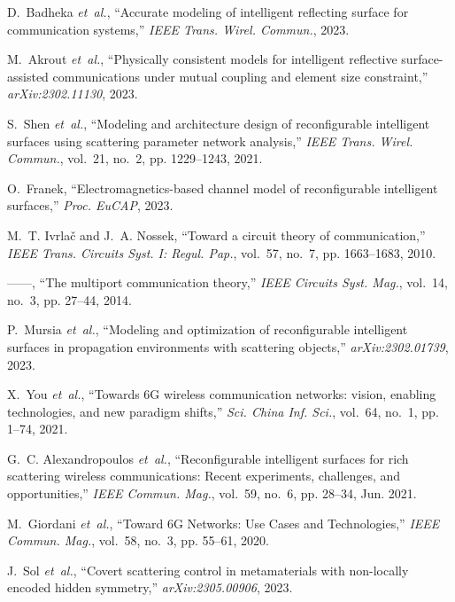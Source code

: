 \documentclass[journal,12pt,onecolumn,draftclsnofoot]{IEEEtran}
\begin{document}
\begin{thebibliography}{10}
D.~Badheka \emph{et~al.}, ``Accurate modeling of intelligent reflecting surface
  for communication systems,'' \emph{IEEE Trans. Wirel. Commun.}, 2023.

M.~Akrout \emph{et~al.}, ``Physically consistent models for intelligent
  reflective surface-assisted communications under mutual coupling and element
  size constraint,'' \emph{arXiv:2302.11130}, 2023.

S.~Shen \emph{et~al.}, ``Modeling and architecture design of reconfigurable
  intelligent surfaces using scattering parameter network analysis,''
  \emph{IEEE Trans. Wirel. Commun.}, vol.~21, no.~2, pp. 1229--1243, 2021.

O.~Franek, ``Electromagnetics-based channel model of reconfigurable intelligent
  surfaces,'' \emph{Proc. EuCAP}, 2023.

M.~T. Ivrla{\v{c}} and J.~A. Nossek, ``Toward a circuit theory of
  communication,'' \emph{IEEE Trans. Circuits Syst. I: Regul. Pap.}, vol.~57,
  no.~7, pp. 1663--1683, 2010.

------, ``The multiport communication theory,'' \emph{IEEE Circuits Syst.
  Mag.}, vol.~14, no.~3, pp. 27--44, 2014.

P.~Mursia \emph{et~al.}, ``Modeling and optimization of reconfigurable
  intelligent surfaces in propagation environments with scattering objects,''
  \emph{arXiv:2302.01739}, 2023.

X.~You \emph{et~al.}, ``Towards {6G} wireless communication networks: vision,
  enabling technologies, and new paradigm shifts,'' \emph{Sci. China Inf.
  Sci.}, vol.~64, no.~1, pp. 1--74, 2021.

G.~C. Alexandropoulos \emph{et~al.}, ``Reconfigurable intelligent surfaces for
  rich scattering wireless communications: {R}ecent experiments, challenges,
  and opportunities,'' \emph{IEEE Commun. Mag.}, vol.~59, no.~6, pp. 28--34,
  Jun. 2021.

M.~Giordani \emph{et~al.}, ``{Toward 6G Networks: Use Cases and
  Technologies},'' \emph{IEEE Commun. Mag.}, vol.~58, no.~3, pp. 55--61, 2020.

J.~Sol \emph{et~al.}, ``Covert scattering control in metamaterials with
  non-locally encoded hidden symmetry,'' \emph{arXiv:2305.00906}, 2023.


\end{thebibliography}
\end{document}
